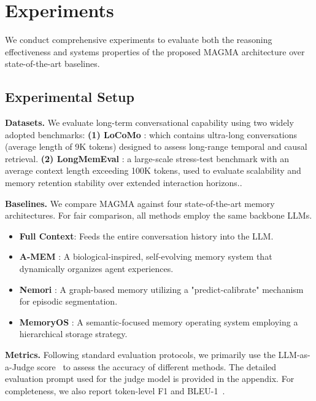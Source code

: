 \documentclass[11pt]{article}
\begin{document}
\section{Experiments}
\label{experiments}
We conduct comprehensive experiments to evaluate both the reasoning effectiveness and systems properties of the proposed MAGMA architecture over state-of-the-art baselines.

\subsection{Experimental Setup}
\label{sec:exp_setup}

\noindent\textbf{Datasets.}
We evaluate long-term conversational capability using two widely adopted benchmarks: \textbf{(1) LoCoMo} \citep{maharana2024evaluating}: which contains ultra-long conversations (average length of 9K tokens) designed to assess long-range temporal and causal retrieval. \textbf{(2) LongMemEval} \citep{wu2024longmemeval}: a large-scale stress-test benchmark with an average context length exceeding 100K tokens, used to evaluate scalability and memory retention stability over extended interaction horizons..

\noindent\textbf{Baselines.}
We compare MAGMA against four state-of-the-art memory architectures. For fair comparison, all methods employ the same backbone LLMs.
\begin{itemize}[leftmargin=*, itemsep=0pt, topsep=2pt]
    \item \textbf{Full Context}: Feeds the entire conversation history into the LLM.
    \item \textbf{A-MEM} \citep{xu2025mem}: A biological-inspired, self-evolving memory system that dynamically organizes agent experiences.
    \item \textbf{Nemori} \citep{nan2025nemori}: A graph-based memory utilizing a "predict-calibrate" mechanism for episodic segmentation.
    \item \textbf{MemoryOS}\citep{Kang2025} : A semantic-focused memory operating system employing a hierarchical storage strategy.
\end{itemize}

\noindent\textbf{Metrics.}
Following standard evaluation protocols, we primarily use the LLM-as-a-Judge score~\citep{zheng2023judging} to assess the accuracy of different methods. The detailed evaluation prompt used for the judge model is provided in the appendix. For completeness, we also report token-level F1 and BLEU-1~\citep{papineni-etal-2002-bleu}. 
\end{document}
